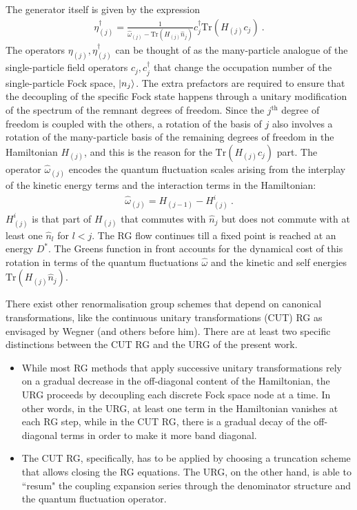 \documentclass[reprint,prb,superscriptaddress]{revtex4-2}
\begin{document}
The generator itself is given by the expression~\cite{anirbanurg1,anirbanurg2}
\begin{equation}\begin{aligned}
	\eta^\dagger_{(j)} = \frac{1}{\hat \omega_{(j)} - \text{Tr}\left(H_{(j)} \hat n_{j}\right) } c^\dagger_{j} \text{Tr}\left(H_{(j)}c_{j}\right)~.
\end{aligned}\end{equation}
{\color{blue}The operators \(\eta_{(j)},\eta^\dagger_{(j)}\) can be thought of as the many-particle analogue of the single-particle field operators \(c_j,c^\dagger_j\) that change the occupation number of the single-particle Fock space, \(\ket{n_j}\). The extra prefactors are required to ensure that the decoupling of the specific Fock state happens through a unitary modification of the spectrum of the remnant degrees of freedom. Since the \(j^\text{th}\) degree of freedom is coupled with the others, a rotation of the basis of \(j\) also involves a rotation of the many-particle basis of the remaining degrees of freedom in the Hamiltonian \(H_{(j)}\), and this is the reason for the \(\text{Tr}\left(H_(j) c_j\right) \) part.}
The operator \(\hat \omega_{(j)}\) encodes the quantum fluctuation scales arising from the interplay of the kinetic energy terms and the interaction terms in the Hamiltonian:
\begin{equation}\begin{aligned}
	\hat \omega_{(j)} = H_{(j-1)} - H^i_{(j)}~.
\end{aligned}\end{equation}
\(H^i_{(j)}\) is that part of \(H_{(j)}\) that commutes with \(\hat n_j\) but does not commute with at least one \(\hat n_l\) for \(l < j\). The RG flow continues till a fixed point is reached at an energy \(D^*\).
{\color{blue}The Greens function in front accounts for the dynamical cost of this rotation in terms of the quantum fluctuations \(\hat \omega\) and the kinetic and self energies \(\text{Tr}\left( H_{(j)}\hat n_j \right) \).}

{\color{blue}There exist other renormalisation group schemes that depend on canonical transformations, like the continuous unitary transformations (CUT) RG as envisaged by Wegner (and others before him). There are at least two specific distinctions between the CUT RG and the URG of the present work.
\begin{itemize}
	\item While most RG methods that apply successive unitary transformations rely on a gradual decrease in the off-diagonal content of the Hamiltonian, the URG proceeds by decoupling each discrete Fock space node at a time. In other words, in the URG, at least one term in the Hamiltonian vanishes at each RG step, while in the CUT RG, there is a gradual decay of the off-diagonal terms in order to make it more band diagonal.
	\item The CUT RG, specifically, has to be applied by choosing a truncation scheme that allows closing the RG equations. The URG, on the other hand, is able to ``resum" the coupling expansion series through the denominator structure and the quantum fluctuation operator.  
\end{itemize}
}
\end{document}
